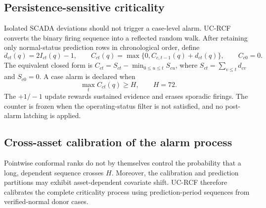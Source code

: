 \subsection{Persistence-sensitive criticality}

Isolated SCADA deviations should not trigger a case-level alarm. UC-RCF converts
the binary firing sequence into a reflected random walk. After retaining only
normal-status prediction rows in chronological order, define
\begin{equation}
d_{ct}(q)=2I_{ct}(q)-1,
\qquad
C_{ct}(q)=\max\{0,C_{c,t-1}(q)+d_{ct}(q)\},
\qquad C_{c0}=0.
\label{eq:criticality_recursion}
\end{equation}
The equivalent closed form is
$C_{ct}=S_{ct}-\min_{0\leq u\leq t}S_{cu}$, where
$S_{ct}=\sum_{v\leq t}d_{cv}$ and $S_{c0}=0$. A case alarm is declared when
\begin{equation}
\max_{t}C_{ct}(q)\geq H,\qquad H=72.
\label{eq:case_alarm}
\end{equation}
The $+1/-1$ update rewards sustained evidence and erases sporadic firings. The
counter is frozen when the operating-status filter is not satisfied, and no
post-alarm latching is applied.

\subsection{Cross-asset calibration of the alarm process}

Pointwise conformal ranks do not by themselves control the probability that a
long, dependent sequence crosses $H$. Moreover, the calibration and prediction
partitions may exhibit asset-dependent covariate shift. UC-RCF therefore
calibrates the complete criticality process using prediction-period sequences
from verified-normal donor cases.

